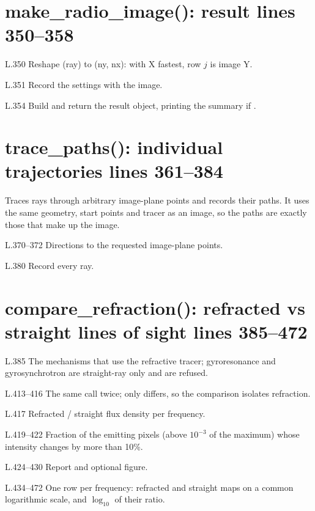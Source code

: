 \section*{\normalsize make\_radio\_image(): result \hfill{\small\mdseries\color{gray}lines 350--358}}

\begin{lines}
\item[L.350] Reshape (ray) to (ny, nx): with X fastest, row $j$ is image Y.
\item[L.351] Record the settings with the image.
\item[L.354] Build and return the result object, printing the summary if .
\end{lines}
\section*{\normalsize trace\_paths(): individual trajectories \hfill{\small\mdseries\color{gray}lines 361--384}}

Traces rays through arbitrary image-plane points and records their paths. It uses the same geometry, start points and tracer as an image, so the paths are exactly those that make up the image.

\begin{lines}
\item[L.370–372] Directions to the requested image-plane points.
\item[L.380] Record every ray.
\end{lines}
\section*{\normalsize compare\_refraction(): refracted vs straight lines of sight \hfill{\small\mdseries\color{gray}lines 385--472}}

\begin{lines}
\item[L.385] The mechanisms that use the refractive tracer; gyroresonance and gyrosynchrotron are straight-ray only and are refused.
\item[L.413–416] The same call twice; only  differs, so the comparison isolates refraction.
\item[L.417] Refracted / straight flux density per frequency.
\item[L.419–422] Fraction of the emitting pixels (above $10^{-3}$ of the maximum) whose intensity changes by more than 10\%.
\item[L.424–430] Report and optional figure.
\item[L.434–472] One row per frequency: refracted and straight maps on a common logarithmic scale, and $\log_{10}$ of their ratio.
\end{lines}


